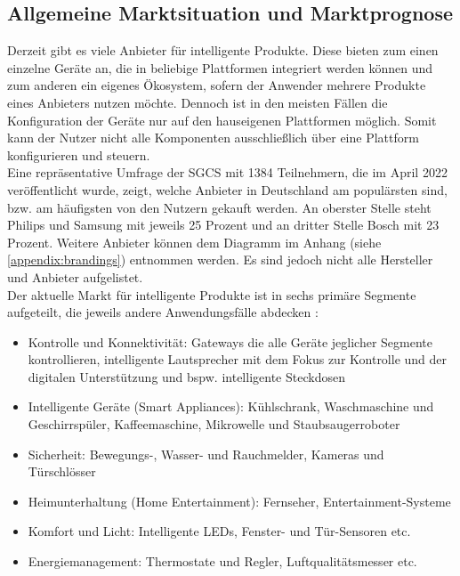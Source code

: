     \subsection{Allgemeine Marktsituation und Marktprognose}
        Derzeit gibt es viele Anbieter für intelligente Produkte. Diese bieten zum einen einzelne Geräte an, die in 
        beliebige Plattformen integriert werden können und zum anderen ein eigenes Ökosystem, sofern der Anwender 
        mehrere Produkte eines Anbieters nutzen möchte. Dennoch ist in den meisten Fällen die Konfiguration der Geräte nur auf 
        den hauseigenen Plattformen möglich. Somit kann der Nutzer nicht alle Komponenten ausschließlich über eine Plattform 
        konfigurieren und steuern. 
        \\
        \linebreak
        Eine repräsentative Umfrage der \ac{SGCS} mit 1384 Teilnehmern, die im April 2022 veröffentlicht wurde, zeigt, welche 
        Anbieter in Deutschland am populärsten sind, bzw. am häufigsten von den Nutzern gekauft werden. An oberster Stelle 
        steht Philips und Samsung mit jeweils 25 Prozent und an dritter Stelle Bosch mit 23 Prozent. Weitere Anbieter können dem 
        Diagramm im Anhang (siehe \ref{appendix:brandings}) entnommen werden. Es sind jedoch nicht alle Hersteller und 
        Anbieter aufgelistet. 
        \\
        \linebreak
        Der aktuelle Markt für intelligente Produkte ist in sechs primäre Segmente aufgeteilt, die jeweils andere Anwendungsfälle 
        abdecken \cite{statista2021}:
        \begin{itemize}
            \item Kontrolle und Konnektivität: Gateways die alle Geräte jeglicher Segmente kontrollieren, intelligente Lautsprecher 
            mit dem Fokus zur Kontrolle und der digitalen Unterstützung und bspw. intelligente Steckdosen
            \item Intelligente Geräte (Smart Appliances): Kühlschrank, Waschmaschine und Geschirrspüler, Kaffeemaschine, Mikrowelle 
            und Staubsaugerroboter
            \item Sicherheit: Bewegungs-, Wasser- und Rauchmelder, Kameras und Türschlösser
            \item Heimunterhaltung (Home Entertainment): Fernseher, Entertainment-Systeme 
            \item Komfort und Licht: Intelligente LEDs, Fenster- und Tür-Sensoren etc.
            \item Energiemanagement: Thermostate und Regler, Luftqualitätsmesser etc. 
        \end{itemize}
